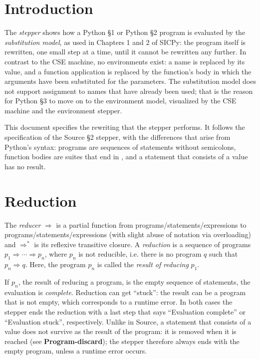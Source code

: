 

\section*{Introduction}

The \emph{stepper} shows how a Python \S 1 or Python \S 2 program is evaluated
by the \emph{substitution model}, as used in Chapters 1 and 2 of SICPy: the
program itself is rewritten, one small step at a time, until it cannot be
rewritten any further. In contrast to the CSE machine, no environments exist:
a name is replaced by its value, and a function application is replaced by
the function's body in which the arguments have been substituted for the
parameters. The substitution model does not support assignment to names that
have already been used; that is the reason for Python \S 3 to move on to the
environment model, visualized by the CSE machine and the environment stepper.

This document specifies the rewriting that the stepper performs. It follows
the specification of the Source \S 2 stepper, with the differences that arise
from Python's syntax: programs are sequences of statements without semicolons,
function bodies are suites that end in , and a statement that
consists of a value has no result.

\section*{Reduction}

The \emph{reducer} $\Rightarrow$ is a partial function from
programs/statements/expressions to
programs/statements/expressions (with slight abuse of notation
via overloading)
and $\Rightarrow^*$ is its reflexive transitive closure.
A \emph{reduction} is a sequence of programs
$p_1 \Rightarrow \cdots \Rightarrow p_n$,
where $p_n$ is not reducible, i.e. there is no
program $q$ such that $p_n \Rightarrow q$.
Here, the program $p_n$ is called the \emph{result
of reducing} $p_1$.

If $p_n$, the result of reducing a program, is the empty
sequence of statements, the evaluation is \emph{complete}.
Reduction can get ``stuck'': the result can be a program
that is not empty, which corresponds to a runtime error. In both cases the
stepper ends the reduction with a last step that says
``Evaluation complete'' or ``Evaluation stuck'', respectively.
Unlike in Source, a statement that consists of a value does not
survive as the result of the program: it is removed when it is reached
(see \textbf{Program-discard}); the stepper therefore always ends with
the empty program, unless a runtime error occurs.

